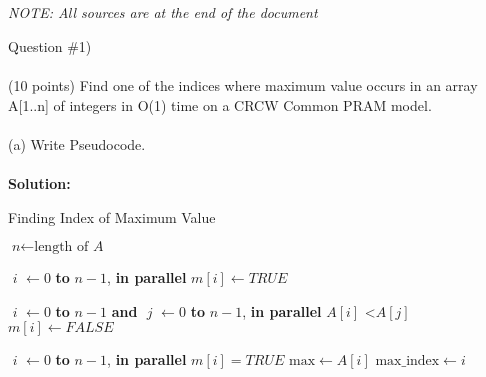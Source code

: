 \documentclass{article}
\begin{document}
\begin{center}
    \\
    \\
    \textit{NOTE: All sources are at the end of the document}
\end{center}

\noindent Question \#1) \\~\\
(10 points) Find one of the indices where maximum value occurs in an array A[1..n] of integers
in O(1) time on a CRCW Common PRAM model. \\~\\



\noindent(a) Write Pseudocode.\\~\\
\textbf{Solution: } 
\begin{algorithm}
    \caption{Finding Index of Maximum Value}\label{euclid}
    \begin{algorithmic}[1]
        \State $\textit{n} \gets \text{length of }\textit{A}$

        \For $\textit{ i } \gets 0$ \textbf{to} ${n - 1}$, \textbf{in parallel}
        \State $m[i] \gets TRUE$
        \EndFor

        \For $\textit{ i } \gets 0$ \textbf{to} ${n - 1}$ \textbf{and} $\textit{ j } \gets 0$ \textbf{to} $n - 1$, \textbf{in parallel}
        \If $A[i]$ \textless $A[j]$
        \State $ m[i] \gets FALSE$
        \EndIf
        \EndFor

        \For $\textit{ i } \gets 0$ \textbf{to} ${n - 1}$, \textbf{in parallel}
        \If $m[i] = TRUE$
        \State $\text{max} \gets A[i]$
        \State $\text{max\_index} \gets i$
        \EndIf
        \EndFor

        \Return {}
        \EndFunction
    \end{algorithmic}
\end{algorithm}
\end{document}
